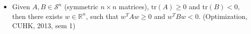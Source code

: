 \documentclass[8pt]{article} %
\newcommand{\tr}{\mbox{tr}}
\begin{document}
\begin{itemize}
	\item Given $A,B\in\mathcal{S}^n$ (symmetric $n\times n$ matrices),
		$\tr(A)\geq 0$ and $\tr(B)<0$, then there exists $w\in\mathbb{R}^n$, such that
		$w^TAw\geq 0$ and $w^TBw<0$. (Optimization, CUHK, 2013, sem 1)
\end{itemize}
\end{document}
